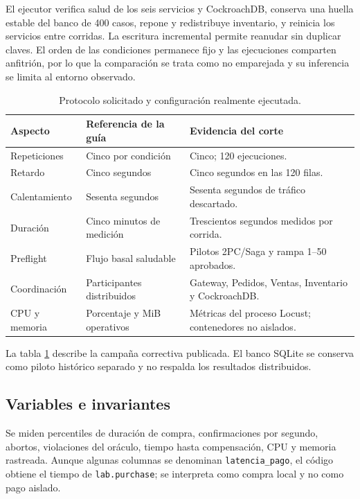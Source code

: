 \documentclass[12pt,a4paper]{article}
\begin{document}
El ejecutor verifica salud de los seis servicios y CockroachDB, conserva una huella estable del banco de 400 casos, repone y redistribuye inventario, y reinicia los servicios entre corridas. La escritura incremental permite reanudar sin duplicar claves. El orden de las condiciones permanece fijo y las ejecuciones comparten anfitrión, por lo que la comparación se trata como no emparejada y su inferencia se limita al entorno observado.

\begin{table}[H]\centering\small
\caption{Protocolo solicitado y configuración realmente ejecutada.}\label{tab:protocolo}
\begin{tabularx}{\textwidth}{lXX}
\toprule Aspecto & Referencia de la guía & Evidencia del corte\\\midrule
Repeticiones & Cinco por condición & Cinco; 120 ejecuciones.\\
Retardo & Cinco segundos & Cinco segundos en las 120 filas.\\
Calentamiento & Sesenta segundos & Sesenta segundos de tráfico descartado.\\
Duración & Cinco minutos de medición & Trescientos segundos medidos por corrida.\\
Preflight & Flujo basal saludable & Pilotos 2PC/Saga y rampa 1--50 aprobados.\\
Coordinación & Participantes distribuidos & Gateway, Pedidos, Ventas, Inventario y CockroachDB.\\
CPU y memoria & Porcentaje y MiB operativos & Métricas del proceso Locust; contenedores no aislados.\\\bottomrule
\end{tabularx}
\end{table}

La tabla \ref{tab:protocolo} describe la campaña correctiva publicada. El banco SQLite se conserva como piloto histórico separado y no respalda los resultados distribuidos.

\subsection{Variables e invariantes}
Se miden percentiles de duración de compra, confirmaciones por segundo, abortos, violaciones del oráculo, tiempo hasta compensación, CPU y memoria rastreada. Aunque algunas columnas se denominan \texttt{latencia\_pago}, el código obtiene el tiempo de \texttt{lab.purchase}; se interpreta como compra local y no como pago aislado.
\end{document}
